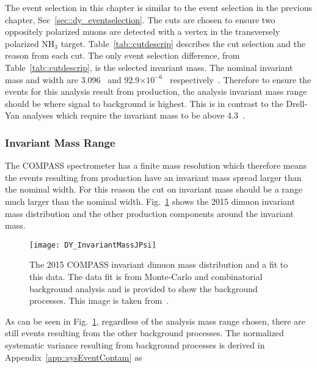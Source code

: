 The event selection in this chapter is similar to the event selection in the
previous chapter, Sec~\ref{sec::dy_eventselection}.  The cuts are chosen to
ensure two oppositely polarized muons are detected with a vertex in the
transversely polarized NH$_3$ target.  Table~\ref{tab::cutdescrip} describes the
cut selection and the reason from each cut.  The only event selection
difference, from Table~\ref{tab::cutdescrip}, is the selected invariant mass.
The nominal {\jp} invariant mass and width are 3.096~{\gvcw} and
92.9$\times10^{-6}$~{\gvcw} respectively~\cite{Tanabashi:2018oca}.  Therefore to
ensure the events for this analysis result from {\jp} production, the analysis
invariant mass range should be where {\jp} signal to background is highest.
This is in contrast to the Drell-Yan analyses which require the invariant mass
to be above 4.3~{\gvcw}.

\subsubsection{{\jp} Invariant Mass Range}\label{sec::jpMassRange}
The COMPASS spectrometer has a finite mass resolution which therefore means the
events resulting from {\jp} production have an invariant mass spread larger than
the nominal {\jp} width.  For this reason the cut on invariant mass should be a
range much larger than the nominal {\jp} width.
Fig.~\ref{fig::DY_InvariantMassJPsi} shows the 2015 dimuon invariant mass
distribution and the other production components around the {\jp} invariant
mass.

\begin{figure}[h!t]
  \centering \texttt{[image: DY\_InvariantMassJPsi]}
  \caption{The 2015 COMPASS invariant dimuon mass distribution and a fit to this
    data.  The data fit is from Monte-Carlo and combinatorial background
    analysis and is provided to show the background processes.  This image is
    taken from~\cite{compassDYpaper}.}
  \label{fig::DY_InvariantMassJPsi}
\end{figure}

As can be seen in Fig.~\ref{fig::DY_InvariantMassJPsi}, regardless of the
analysis mass range chosen, there are still events resulting from the other
background processes.  The normalized systematic variance resulting from
background processes is derived in Appendix~\ref{app::sysEventContam} as

